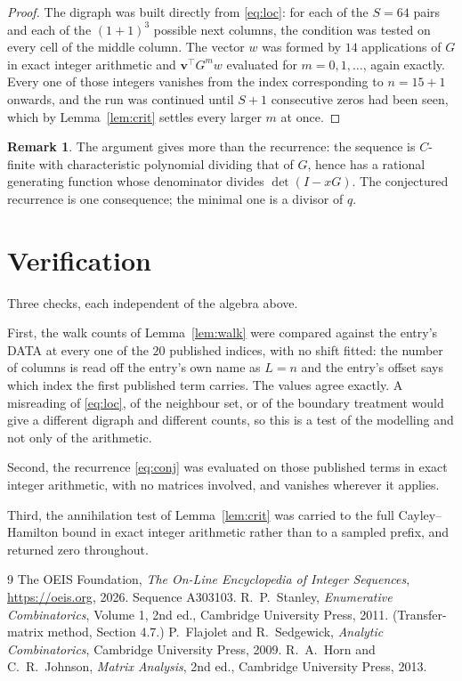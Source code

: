 \documentclass[11pt,a4paper]{article}
\theoremstyle{plain}
\theoremstyle{definition}
\newtheorem{remark}[theorem]{Remark}
\begin{document}
\begin{proof}
The digraph was built directly from \eqref{eq:loc}: for each of the $S=64$ pairs and each
of the $(1+1)^{3}$ possible next columns, the condition was tested on every cell of
the middle column. The vector $w$ was formed by $14$ applications of $G$ in exact integer
arithmetic and $\mathbf{v}^{\!\top}G^{m}w$ evaluated for $m=0,1,\dots$, again exactly.
Every one of those integers vanishes from the index corresponding to $n=15+1$ onwards,
and the run was continued until $S+1$ consecutive zeros had been seen, which by
Lemma~\ref{lem:crit} settles every larger $m$ at once.
\end{proof}

\begin{remark}
The argument gives more than the recurrence: the sequence is $C$-finite with characteristic
polynomial dividing that of $G$, hence has a rational generating function whose denominator
divides $\det(I-xG)$. The conjectured recurrence is one consequence; the minimal one is a
divisor of $q$.
\end{remark}

\section{Verification}

Three checks, each independent of the algebra above.

First, the walk counts of Lemma~\ref{lem:walk} were compared against the entry's DATA at
every one of the $20$ published indices, with no shift fitted: the number of columns is
read off the entry's own name as $L=n$ and the entry's offset says which index the first
published term carries. The values agree exactly. A misreading of \eqref{eq:loc}, of the
neighbour set, or of the boundary treatment would give a different digraph and different
counts, so this is a test of the modelling and not only of the arithmetic.

Second, the recurrence \eqref{eq:conj} was evaluated on those published terms in exact
integer arithmetic, with no matrices involved, and vanishes wherever it applies.

Third, the annihilation test of Lemma~\ref{lem:crit} was carried to the full
Cayley--Hamilton bound in exact integer arithmetic rather than to a sampled prefix, and
returned zero throughout.

\begin{thebibliography}{9}
 The OEIS Foundation, \emph{The On-Line Encyclopedia of Integer
Sequences}, \url{https://oeis.org}, 2026. Sequence A303103.
 R.~P.~Stanley, \emph{Enumerative Combinatorics}, Volume 1, 2nd ed.,
Cambridge University Press, 2011. (Transfer-matrix method, Section 4.7.)
 P.~Flajolet and R.~Sedgewick, \emph{Analytic Combinatorics}, Cambridge
University Press, 2009.
 R.~A.~Horn and C.~R.~Johnson, \emph{Matrix Analysis}, 2nd ed., Cambridge
University Press, 2013.
\end{thebibliography}
\end{document}
